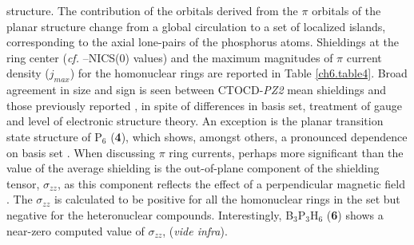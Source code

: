 structure. The contribution of the orbitals derived from the $\pi$ orbitals
of the planar structure change from a global circulation to a set of localized 
islands, corresponding to the axial lone-pairs of the phosphorus atoms.
Shieldings at the ring center (\textit{cf.} --NICS(0) values) and the maximum magnitudes of 
$\pi$ current density ($j_{max}$) for the homonuclear rings are reported in
Table \ref{ch6.table4}. Broad agreement in size and sign is seen between
CTOCD-\textit{PZ2} mean shieldings and those previously
reported \cite{schleyer1}, in spite of differences in basis set, treatment of gauge and level
of electronic structure theory. An exception is the planar transition
state structure of P$_6$ (\textbf{4}), which shows, amongst others, a pronounced dependence on basis
set \cite{footnote,sadlej}. When
discussing $\pi$ ring currents, perhaps more significant than the value of the
average shielding is the out-of-plane component of the shielding
tensor, $\sigma_{zz}$, as this component reflects the effect of a
perpendicular magnetic field \cite{steiner2,corminboeuf,viglione}. The $\sigma_{zz}$
is calculated to be positive for all the homonuclear rings in the
set but negative for the heteronuclear compounds. Interestingly, B$_3$P$_3$H$_6$ (\textbf{6})
shows a near-zero computed value of $\sigma_{zz}$, (\textit{vide infra}).

